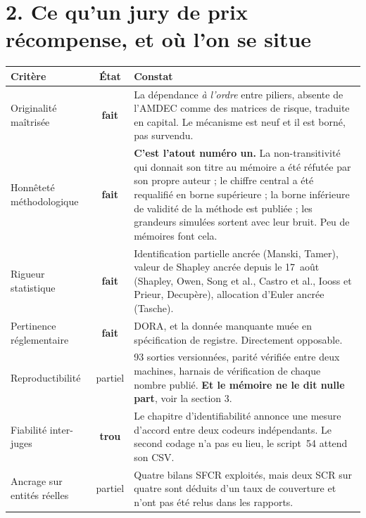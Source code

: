 \documentclass[11pt,a4paper]{article}
\newcommand{\fait}{\cellcolor{softgreen}\textbf{fait}}
\newcommand{\partiel}{\cellcolor{softamber}partiel}
\newcommand{\trou}{\cellcolor{softred}\textbf{trou}}
\begin{document}
\section*{2. Ce qu'un jury de prix récompense, et où l'on se situe}

\begin{center}\footnotesize
\renewcommand{\arraystretch}{1.3}
\begin{tabular}{@{}p{4.3cm} c p{9.4cm}@{}}
\toprule
\textbf{Critère} & \textbf{État} & \textbf{Constat} \\
\midrule
Originalité maîtrisée & \fait &
La dépendance \emph{à l'ordre} entre piliers, absente de l'AMDEC comme des matrices de risque,
traduite en capital. Le mécanisme est neuf et il est borné, pas survendu. \\

Honnêteté méthodologique & \fait &
\textbf{C'est l'atout numéro un.} La non-transitivité qui donnait son titre au mémoire a été
réfutée par son propre auteur ; le chiffre central a été requalifié en borne supérieure ; la
borne inférieure de validité de la méthode est publiée ; les grandeurs simulées sortent avec
leur bruit. Peu de mémoires font cela. \\

Rigueur statistique & \fait &
Identification partielle ancrée (Manski, Tamer), valeur de Shapley ancrée depuis le 17~août
(Shapley, Owen, Song et al., Castro et al., Iooss et Prieur, Decupère), allocation d'Euler
ancrée (Tasche). \\

Pertinence réglementaire & \fait &
DORA, et la donnée manquante muée en spécification de registre. Directement opposable. \\

Reproductibilité & \partiel &
93 sorties versionnées, parité vérifiée entre deux machines, harnais de vérification de chaque
nombre publié. \textbf{Et le mémoire ne le dit nulle part}, voir la section 3. \\

Fiabilité inter-juges & \trou &
Le chapitre d'identifiabilité annonce une mesure d'accord entre deux codeurs indépendants. Le
second codage n'a pas eu lieu, le script~54 attend son CSV. \\

Ancrage sur entités réelles & \partiel &
Quatre bilans SFCR exploités, mais deux SCR sur quatre sont déduits d'un taux de couverture et
n'ont pas été relus dans les rapports. \\
\bottomrule
\end{tabular}
\end{center}
\end{document}
